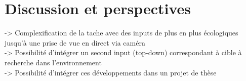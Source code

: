 
\chapter{Discussion et perspectives} %

\label{Discussion} %


-> Complexification de la tache avec des inputs de plus en plus écologiques jusqu'à une prise de vue en direct via caméra \\
-> Possibilité d'intégrer un second input (top-down) correspondant à cible à recherche dans l'environnement \\
-> Possibilité d'intégrer ces développements dans un projet de thèse \\

